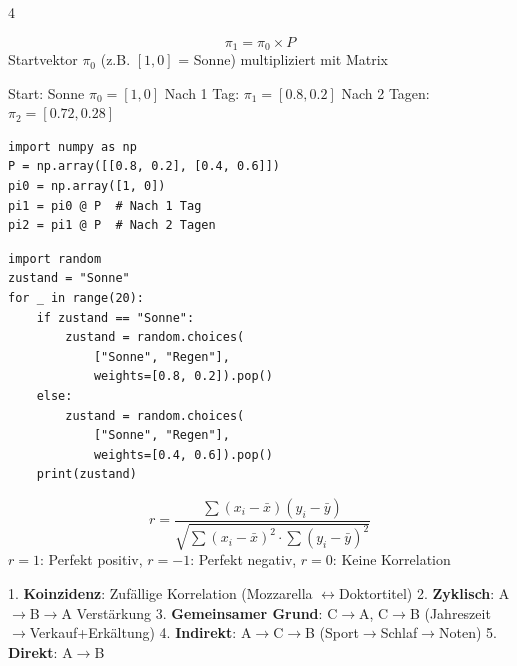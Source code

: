 \begin{landscape}
\begin{multicols*}{4}
		\begin{cheatSheetBox}[title=Vorhersage]
			\[
				\pi_1 = \pi_0 \times P
			\]
			Startvektor $\pi_0$ (z.B. $[1, 0]$ = Sonne) multipliziert mit Matrix
		\end{cheatSheetBox}

		\begin{cheatSheetBox}[title=Beispiel-Berechnung]
			Start: Sonne $\pi_0 = [1, 0]$
			Nach 1 Tag: $\pi_1 = [0.8, 0.2]$
			Nach 2 Tagen: $\pi_2 = [0.72, 0.28]$
		\end{cheatSheetBox}

		\begin{cheatSheetBox}[title=Python: Matrix und Vorhersage]
			\begin{lstlisting}
import numpy as np
P = np.array([[0.8, 0.2], [0.4, 0.6]])
pi0 = np.array([1, 0])
pi1 = pi0 @ P  # Nach 1 Tag
pi2 = pi1 @ P  # Nach 2 Tagen
			\end{lstlisting}
		\end{cheatSheetBox}

		\begin{cheatSheetBox}[title=Simulation mit Zufallszahlen]
			\begin{lstlisting}
import random
zustand = "Sonne"
for _ in range(20):
    if zustand == "Sonne":
        zustand = random.choices(
            ["Sonne", "Regen"], 
            weights=[0.8, 0.2]).pop()
    else:
        zustand = random.choices(
            ["Sonne", "Regen"], 
            weights=[0.4, 0.6]).pop()
    print(zustand)
			\end{lstlisting}
		\end{cheatSheetBox}


		\begin{cheatSheetBox}[title=Korrelationskoeffizient]
			\[
				r = \frac{\sum(x_i - \bar{x})(y_i - \bar{y})}{\sqrt{\sum(x_i - \bar{x})^2 \cdot \sum(y_i - \bar{y})^2}}
			\]
			$r=1$: Perfekt positiv, $r=-1$: Perfekt negativ, $r=0$: Keine Korrelation
		\end{cheatSheetBox}

		\begin{cheatSheetBox}[title=Fünf Arten von Kausalität]
			1. \textbf{Koinzidenz}: Zufällige Korrelation (Mozzarella $\leftrightarrow$Doktortitel)
			2. \textbf{Zyklisch}: A$\rightarrow$B$\rightarrow$A Verstärkung
			3. \textbf{Gemeinsamer Grund}: C$\rightarrow$A, C$\rightarrow$B (Jahreszeit$\rightarrow$Verkauf+Erkältung)
			4. \textbf{Indirekt}: A$\rightarrow$C$\rightarrow$B (Sport$\rightarrow$Schlaf$\rightarrow$Noten)
			5. \textbf{Direkt}: A$\rightarrow$B
		\end{cheatSheetBox}


\end{multicols*}
\end{landscape}
